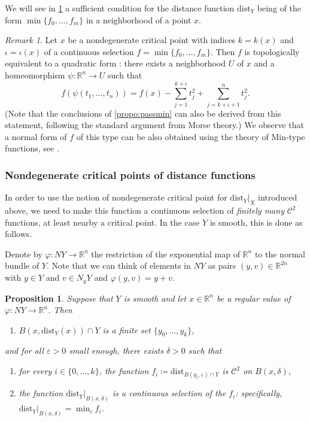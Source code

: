 \documentclass{amsart}
\newcommand{\R}{\mathbb{R}}
\newcommand{\dd}{\mathrm{dist}}
\newcommand{\dist}{{\mathrm{dist}_Y|_X}}
\def\lini{k}
\def\quadi{\iota}
\newtheorem{proposition}[subsubsection]{Proposition}
\theoremstyle{definition}
\theoremstyle{remark}
\newtheorem{remark}[subsubsection]{Remark}
\newcommand{\be}{\begin{equation}}
\newcommand{\ee}{\end{equation}}
\begin{document}
{ We will see in \cref{P:regular-value} a sufficient condition for the distance function $\dd_Y$ being of the form $\min\{f_0, \ldots, f_m\}$ in a neighborhood of a point $x$.  



\begin{remark}
\label{rmk:normalformdist}
Let $x$ be a nondegenerate critical point with indices $\lini = \lini(x)$ and $\quadi = \quadi(x)$ of a continuous selection $f=\min\{f_0, \ldots, f_m\}$. Then $f$ is topologically equivalent to a quadratic form \cite[Corollary~3.4]{JongenPallaschke1988}:  
there exists a neighborhood $U$ of $x$ and a homeomorphism $\psi\colon\R^n \to U$ such that
\be
f(\psi(t_1, \ldots, t_{n})) = f(x) - \sum_{j=1}^{\lini + \quadi}t_{j}^2+\sum_{j=\lini + \quadi + 1}^n t_j^2 .
\ee
(Note that the conclusions of \cref{propo:passmin} can also be derived from this statement, following the standard argument from Morse theory.) 
We observe that a normal form of $f$ of this type can be also obtained using the theory of Min-type functions, see \cite[Sect.~3.2]{gershkovich1997morse}.
\end{remark}
}


\subsubsection{Nondegenerate critical points of distance functions}
In order to use the notion of nondegenerate critical point for $\dist$ introduced above, we need to make this function a continuous selection of \emph{finitely many} $\mathcal{C}^2$ functions, at least nearby a
critical point. In the case $Y$ is smooth, this is done as follows.

Denote by $\varphi \colon NY\to \R^n$ the restriction of the exponential map of $\R^n$ to the normal bundle of $Y$. Note that we can think of elements in $NY$ as pairs $(y, v)\in \R^{2n}$ with $y\in Y$ and $v\in N_yY$ and $\varphi(y,v)=y+v.$

\begin{proposition}
\label{P:regular-value}
Suppose that $Y$ is smooth and let $x \in \R^n$ be a regular value of $\varphi \colon NY \to \R^n$. Then \begin{enumerate}
\item \label{I:finite} $B(x, \dd_Y(x)) \cap Y$ is a finite set $\{y_0, \ldots, y_k\}$,
\end{enumerate}
and for all $\varepsilon > 0$ small enough, there exists $\delta >0$ such that
\begin{enumerate}[resume]
\item \label{I:C2} for every $i \in \{0, \ldots, k\}$, the function $f_i \coloneqq \dd_{B(y_i, \varepsilon) \cap Y}$ is $\mathcal{C}^2$ on $B(x, \delta)$,
\item \label{I:CS} the function $\dd_Y|_{B(x, \delta)}$ is a continuous selection of the $f_i$: specifically, $\dd_Y|_{B(x, \delta)} = \min_i f_i$.
\end{enumerate}
\end{proposition}
\end{document}
